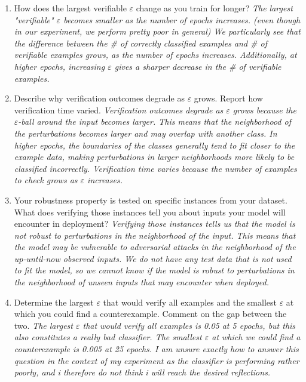 \documentclass[11pt,a4paper]{article}
\begin{document}
\begin{enumerate}[leftmargin=*]
  \item How does the largest verifiable $\varepsilon$ change as you train for longer?
  \textit{The largest "verifiable" $\varepsilon$ becomes smaller as the number of epochs increases. (even though in our experiment, we perform pretty poor in general)
  We particularly see that the difference between the \# of correctly classified examples and \# of verifiable examples grows, as the number of epochs increases.
  Additionally, at higher epochs, increasing $\varepsilon$ gives a sharper decrease in the \# of verifiable examples.}

  \item Describe why verification outcomes degrade as $\varepsilon$ grows. Report how verification time varied.
  \textit{Verification outcomes degrade as $\varepsilon$ grows because the $\varepsilon$-ball around the input becomes larger.
  This means that the neighborhood of the perturbations becomes larger and may overlap with another class.
  In higher epochs, the boundaries of the classes generally tend to fit closer to the example data, making perturbations
  in larger neighborhoods more likely to be classified incorrectly.
  Verification time varies because the number of examples to check grows as $\varepsilon$ increases.
  }

  \item Your robustness property is tested on specific instances from your dataset. What does verifying those instances tell you about inputs your model will encounter in deployment?
  \textit{Verifying those instances tells us that the model is not robust to perturbations in the neighborhood of the input.
  This means that the model may be vulnerable to adversarial attacks in the neighborhood of the up-until-now observed inputs.
  We do not have any test data that is not used to fit the model, so we cannot know if the model is robust to perturbations in the neighborhood of unseen inputs that may encounter when deployed.
  }

  \item Determine the largest $\varepsilon$ that would verify all examples and the smallest $\varepsilon$ at which you could find a counterexample. Comment on the gap between the two.
  \textit{The largest $\varepsilon$ that would verify all examples is 0.05 at 5 epochs, but this also constitutes a really bad classifier.
  The smallest $\varepsilon$ at which we could find a counterexample is 0.005 at 25 epochs.
  I am unsure exactly how to answer this question in the context of my experiment as the classifier is performing rather poorly,
  and i therefore do not think i will reach the desired reflections.
  }


\end{enumerate}
\end{document}

